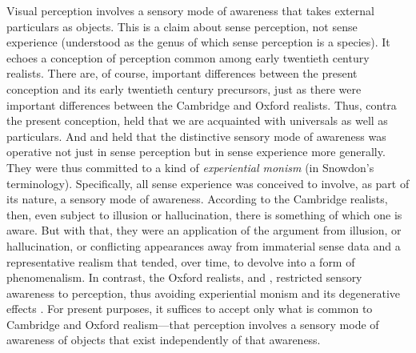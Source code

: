 \documentclass[12pt]{article}
\begin{document}
Visual perception involves a sensory mode of awareness that takes external particulars as objects. This is a claim about sense perception, not sense experience (understood as the genus of which sense perception is a species). It echoes a conception of perception common among early twentieth century realists. There are, of course, important differences between the present conception and its early twentieth century precursors, just as there were important differences between the Cambridge and Oxford realists. Thus, contra the present conception, \citet[]{Russell:1912uq} held that we are acquainted with universals as well as particulars. And \citet[]{Russell:1912uq} and \citet[]{Price:1932fk} held that the distinctive sensory mode of awareness was operative not just in sense perception but in sense experience more generally. They were thus committed to a kind of \emph{experiential monism} (in Snowdon's \citeyear{Snowdon:2008oz} terminology). Specifically, all sense experience was conceived to involve, as part of its nature, a sensory mode of awareness. According to the Cambridge realists, then, even subject to illusion or hallucination, there is something of which one is aware. But with that, they were an application of the argument from illusion, or hallucination, or conflicting appearances away from immaterial sense data and a representative realism that tended, over time, to devolve into a form of phenomenalism. In contrast, the Oxford realists, \citet{Cook-Wilson:1926sf} and \citet[]{Prichard:1906gf,Prichard:1909yg}, restricted sensory awareness to perception, thus avoiding experiential monism and its degenerative effects \citep[see][]{Marion:2000kl,Marion:2000ai,Kalderon:2010fk}. For present purposes, it suffices to accept only what is common to Cambridge and Oxford realism---that perception involves a sensory mode of awareness of objects that exist independently of that awareness. 
\end{document}
